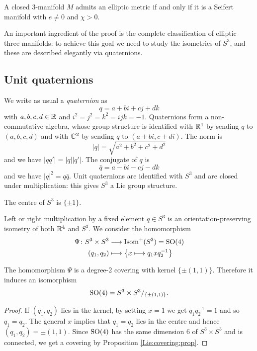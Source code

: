 \begin{teo} \label{S3:teo}
A closed 3-manifold $M$ admits an elliptic metric if and only if it is a Seifert manifold  with $e\neq 0$ and $\chi>0$.
\end{teo}

An important ingredient of the proof is the complete classification of elliptic three-manifolds: to achieve this goal we need to study the isometries of $S^3$, and these are described elegantly via quaternions. 

\subsection{Unit quaternions}
We write as usual a \emph{quaternion} as
$$q= a+bi+cj+dk$$
with $a,b,c,d \in \mathbb{R}$ and $i^2 = j^2 = k^2 =ijk = -1$. Quaternions form a non-commutative algebra, whose group structure is identified with $\mathbb{R}^4$ by sending $q$ to $(a,b,c,d)$ and with $\mathbb{C}^2$ by sending $q$ to $(a+bi, c+di)$. The norm is
$$|q| = \sqrt{a^2 + b^2 + c^2 + d^2}$$
and we have $|qq'| = |q||q'|$. The conjugate of $q$ is
$$\bar q = a-bi-cj-dk$$
and we have $|q|^2 = q\bar q$.
Unit quaternions are identified with $S^3$ and are closed under multiplication: this gives $S^3$ a Lie group structure. 
\begin{ex}
The centre of $S^3$ is $\{\pm 1\}$.
\end{ex}
Left or right multiplication by a fixed element $q\in S^3$ is an orientation-preserving isometry of both $\mathbb{R}^4$ and $S^3$. We consider the homomorphism
\begin{align*}
\Psi\colon S^3 \times S^3 & \longrightarrow {\rm Isom}^+(S^3) = {\rm SO}(4) \\
(q_1, q_2) & \longmapsto \left\{x \longmapsto q_1xq_2^{-1}\right\}
\end{align*}

\begin{prop}
The homomorphism $\Psi$ is a degree-2 covering with kernel $\{\pm (1,1)\}$. Therefore it induces an isomorphism
$${\rm SO}(4) = S^3\times S^3 /_{\{\pm (1,1)\}}.$$
\end{prop}
\begin{proof}
If $(q_1,q_2)$ lies in the kernel, by setting $x=1$ we get $q_1q_2^{-1}=1$ and so $q_1=q_2$. The general $x$ implies that $q_1=q_2$ lies in the centre and hence $(q_1,q_2) = \pm(1,1)$. Since ${\rm SO}(4)$ has the same dimension $6$ of $S^3\times S^3$ and is connected, we get a covering by Proposition \ref{Lie:covering:prop}.
\end{proof}

